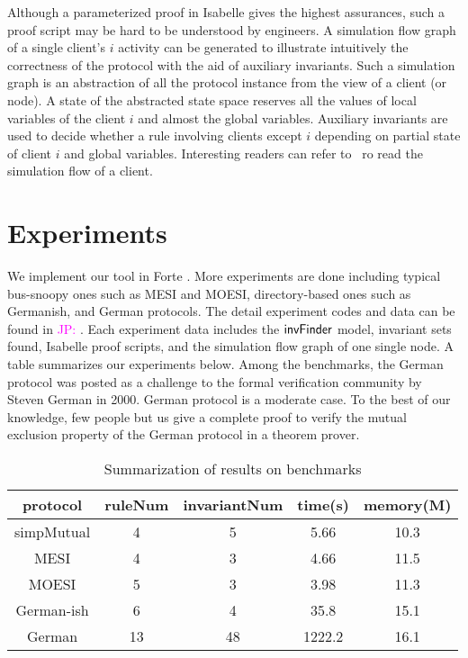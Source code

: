 \documentclass{llncs}
\newcommand\JP[1]{\textcolor{magenta}{JP: #1}}
\begin{document}
Although a parameterized proof in Isabelle gives the highest
assurances, such a proof script may be hard to be understood by
engineers. A simulation flow graph of a single client's $i$ activity
can be generated to illustrate intuitively the correctness of the
protocol with the aid of auxiliary invariants. Such a simulation
graph is an abstraction of all the protocol instance from the view
of a client (or node). A state of the abstracted state space
reserves all the values of local variables of  the client $i$  and
almost the global variables. Auxiliary invariants are used to decide
whether a rule involving clients except $i$ depending on partial
state of client $i$ and global variables. Interesting readers can
refer to~\cite{LiCache14} ro read the simulation flow of a client.


\section{Experiments}
We implement our tool in Forte \cite{Forte}. More experiments are
done including typical bus-snoopy ones such as MESI and MOESI,
 directory-based ones such as  Germanish, and  German protocols. The detail experiment codes and data can
be found in \JP{\cite{LiCache14}}. Each experiment data includes the
${\sf invFinder}$ model, invariant sets found, Isabelle proof
scripts, and the simulation flow graph of one single node. A table
summarizes  our experiments below.
Among the benchmarks, the German protocol   was posted
 as
a challenge to the formal verification community by Steven German in
2000. German protocol is a moderate case.
To the best of our knowledge, few people but us give a complete proof to verify
the mutual exclusion  property of the German protocol
 in a theorem prover.

 \begin{table}[htbp] \label{Summarization of experiment results}
\centering \caption{Summarization of results on benchmarks}
\begin{tabular}{|c|c|c|c|c|}
\hline
protocol &  ruleNum & invariantNum & time(s) & memory(M) \\
\hline
simpMutual& 4& 5 & 5.66 & 10.3 \\
\hline
MESI & 4& 3 & 4.66 & 11.5  \\
\hline
MOESI &  5& 3 &3.98 & 11.3  \\
\hline
 German-ish  & 6& 4 &35.8 & 15.1   \\
\hline
German & 13 & 48 & 1222.2 & 16.1   \\
\hline
\end{tabular}
\end{table}
\end{document}
